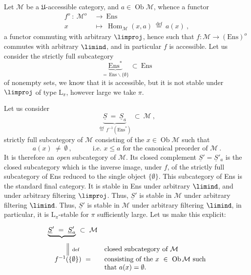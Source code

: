 Let $\mathcal{M}$ be a $\mathfrak{U}$-accessible category, and $a\in\operatorname{Ob}\mathcal{M}$, whence a functor
\[
\begin{aligned}
f^o\ :\ \mathcal{M}^o\ &\longrightarrow\ \mathrm{Ens}\\
x\ &\longmapsto\ \operatorname{Hom}_{\mathcal{M}}(x,a)\ \overset{\text{def}}{=}\ a(x)\ ,
\end{aligned}
\]
a functor commuting with arbitrary $\limproj$, hence such that $f:\mathcal{M}\longrightarrow(\mathrm{Ens})^o$ commutes with arbitrary $\limind$, and in particular $f$ is accessible. Let us consider the strictly full subcategory
\[
\underbrace{\mathrm{Ens}^*}_{=\,\mathrm{Ens}\backslash\{\emptyset\}}\ \subset\ \mathrm{Ens}
\]
of nonempty sets, we know that it is accessible, but it is not stable under $\limproj$ of type $\mathrm{L}_\pi$, however large we take $\pi$. %

Let us consider
\[
\underbrace{\underline{S}\ =\ \underline{S}_a}_{\overset{\text{def}}{=}\,f^{-1}(\mathrm{Ens}^*)}\ \subset\ \mathcal{M}\ ,
\]
strictly full subcategory of $\mathcal{M}$ consisting of the $x\in\operatorname{Ob}\mathcal{M}$ such that
\[
a(x)\ \neq\ \emptyset\ ,\qquad\quad \text{i.e. } x\leqslant a \text{ for the canonical preorder of } \mathcal{M}\ .
\]
It is therefore an \textit{open} subcategory of $\mathcal{M}$. Its closed complement $\underline{S}'=\underline{S}'_a$ is the closed subcategory which is the inverse image, under $f$, of the strictly full subcategory of Ens reduced to the single object $\{\emptyset\}$. This subcategory of Ens is the standard final category. It is stable in Ens under arbitrary $\limind$, and under arbitrary filtering $\limproj$. Thus, $\underline{S}'$ is stable in $\mathcal{M}$ under arbitrary filtering $\limind$. Thus, $\underline{S}'$ is stable in $\mathcal{M}$ under arbitrary filtering $\limind$, in particular, it is $\mathrm{L}_\pi$-stable for $\pi$ sufficiently large. Let us make this explicit:

\[
\begin{array}{cl}
\underbrace{\underline{S}'\ =\ \underline{S}'_a}_{}\ \subset\ \mathcal{M} & \\
\Big\|\ \text{\scriptsize def} & \text{closed subcategory of } \mathcal{M}\\
f^{-1}(\{\emptyset\})\ = & \text{consisting of the } x\ \in\ \operatorname{Ob}\mathcal{M} \text{ such}\\
 & \text{that } a(x)=\emptyset.
\end{array}
\]

